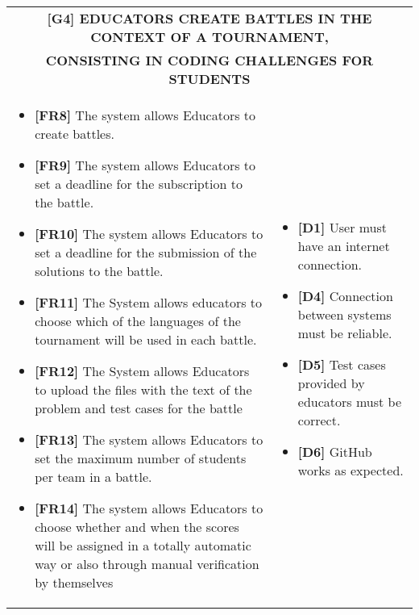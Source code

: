 \documentclass{article}
\begin{document}
\begin{table}[H]
\begin{adjustwidth}{-1in}{-1in}
 \renewcommand{\arraystretch}{1.5}
    \begin{tabular}{|p{9.5cm}|p{9.5cm}|}
        \hline
        \multicolumn{2}{|c|}{\textbf{[G4] EDUCATORS CREATE BATTLES IN THE CONTEXT OF A TOURNAMENT,}} \\
        \multicolumn{2}{|c|}{\textbf{CONSISTING IN CODING CHALLENGES FOR STUDENTS}} \\
        \hline
        \begin{itemize}[label={}, left=0pt, align=left, itemsep=5pt]
            \item \textbf{[FR8]} The system allows Educators to create battles.
            \item \textbf{[FR9]} The system allows Educators to set a deadline for the subscription to the battle.
            \item \textbf{[FR10]} The system allows Educators to set a deadline for the submission of the solutions to the battle.
            \item \textbf{[FR11]} The System allows educators to choose which of the languages of the tournament will be used in each battle.
            \item \textbf{[FR12]} The System allows Educators to upload the files with the text of the problem and test cases for the battle
            \item \textbf{[FR13]} The system allows Educators to set the maximum number of students per team in a battle.
            \item \textbf{[FR14]} The system allows Educators to choose whether and when the scores will be assigned in a totally automatic way or also through manual verification by themselves
        \end{itemize} &
        \begin{itemize}[label={}, left=0pt, align=left, itemsep=5pt]
            \item \textbf{[D1]} User must have an internet connection.
            \item \textbf{[D4]} Connection between systems must be reliable.
            \item \textbf{[D5]} Test cases provided by educators must be correct.
            \item \textbf{[D6]} GitHub works as expected.
        \end{itemize} \\
        \hline
    \end{tabular}
\end{adjustwidth}
\end{table}
\end{document}
